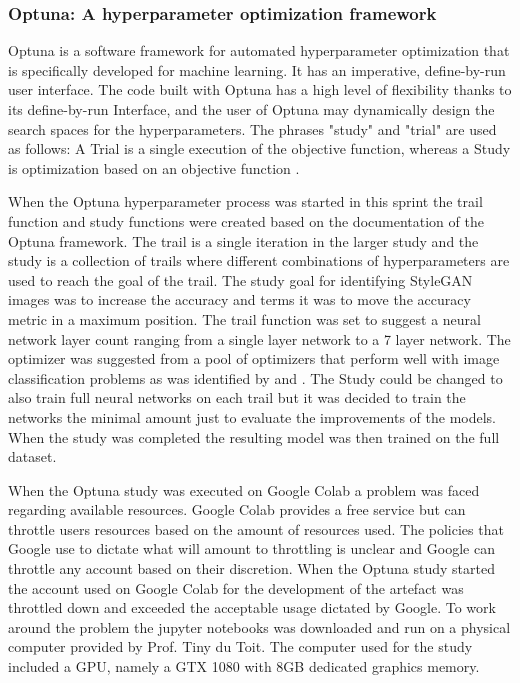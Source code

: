 \subsubsection{Optuna: A hyperparameter optimization framework}

Optuna is a software framework for automated hyperparameter optimization that is specifically developed for machine learning. It has an imperative, define-by-run user interface. The code built with Optuna has a high level of flexibility thanks to its define-by-run Interface, and the user of Optuna may dynamically design the search spaces for the hyperparameters. The phrases "study" and "trial" are used as follows: A Trial is a single execution of the objective function, whereas a Study is optimization based on an objective function \citep{optuna2019}.

When the Optuna hyperparameter process was started in this sprint the trail function and study functions were created based on the documentation of the Optuna framework. The trail is a single iteration in the larger study and the study is a collection of trails where different combinations of hyperparameters are used to reach the goal of the trail. The study goal for identifying StyleGAN images was to increase the accuracy and \cite{optuna2019} terms it was to move the accuracy metric in a maximum position. The trail function was set to suggest a neural network layer count ranging from a single layer network to a 7 layer network. The optimizer was suggested from a pool of optimizers that perform well with image classification problems as was identified by \cite{bera2020analysis} and \cite{kandel2020comparative}. The Study could be changed to also train full neural networks on each trail but it was decided to train the networks the minimal amount just to evaluate the improvements of the models. When the study was completed the resulting model was then trained on the full dataset.

When the Optuna study was executed on Google Colab a problem was faced regarding available resources. Google Colab provides a free service but can throttle users resources based on the amount of resources used. The policies that Google use to dictate what will amount to throttling is unclear and Google can throttle any account based on their discretion. When the Optuna study started the account used on Google Colab for the development of the artefact was throttled down and exceeded the acceptable usage dictated by Google. To work around the problem the jupyter notebooks was downloaded and run on a physical computer provided by Prof. Tiny du Toit. The computer used for the study included a GPU, namely a GTX 1080 with 8GB dedicated graphics memory.

